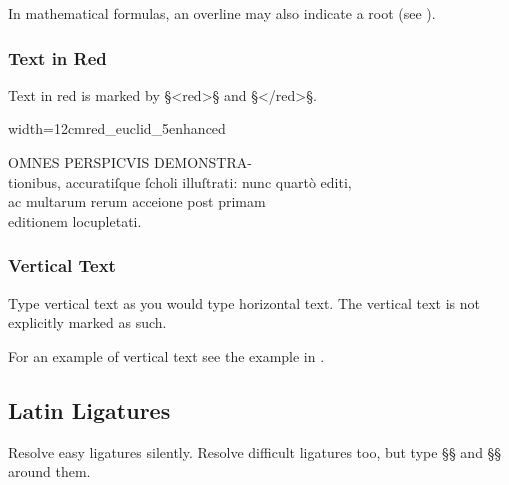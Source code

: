 \begin{crossref}
In mathematical formulas, an overline may also indicate a root (see ).
\end{crossref}


\subsubsection{Text in Red}
\label{section text in red}

\begin{mainruleLessImportant}
Text in red is marked by §<red>§ and §</red>§.
\end{mainruleLessImportant}

\vspace{3mm}
\begin{sampleImageSmall}{width=12cm}{red_euclid_5enhanced}

\begin{typeLatin}
OMNES PERSPICVIS DEMONSTRA- \\
tionibus, accuratiſque ſcholi illuſtrati: nunc quartò editi, \\
ac multarum rerum acceione post primam \\
editionem locupletati. \\
\end{typeLatin}
\end{sampleImageSmall}

\subsubsection{Vertical Text}

\begin{mainrule}
Type vertical text as you would type horizontal text. The vertical text is not explicitly marked as such.
\end{mainrule}

\begin{crossref}
For an example of vertical text see the example in .
\end{crossref}


\tocspace
\subsection{Latin Ligatures}
\label{section latin ligatures}

\begin{mainrule}
Resolve easy ligatures silently. Resolve difficult ligatures too, but type §{§ and §}§ around them.
\end{mainrule}

